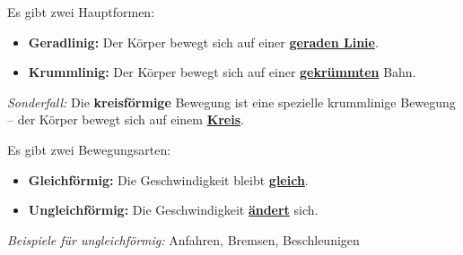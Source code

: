 \documentclass[11pt, a4paper]{article}
\newcommand{\abschnitt}[1]{%
    \vspace{8pt}%
    \noindent{\large\bfseries\textcolor{physik}{#1}}%
    \vspace{4pt}%
}
\newcommand{\lsg}[1]{\textcolor{loesung}{\underline{\textbf{#1}}}}
\begin{document}
\begin{merkkasten}
Es gibt zwei Hauptformen:
\begin{itemize}[leftmargin=1.5em, itemsep=2pt]
    \item \textbf{Geradlinig:} Der Körper bewegt sich auf einer \lsg{geraden Linie}.
    \item \textbf{Krummlinig:} Der Körper bewegt sich auf einer \lsg{gekrümmten} Bahn.
\end{itemize}

\textit{Sonderfall:} Die \textbf{kreisförmige} Bewegung ist eine spezielle krummlinige Bewegung -- der Körper bewegt sich auf einem \lsg{Kreis}.
\end{merkkasten}

\vspace{0.3em}

\abschnitt{3. Einteilung nach Bewegungsart}

\begin{center}
\end{center}

\begin{merkkasten}
Es gibt zwei Bewegungsarten:
\begin{itemize}[leftmargin=1.5em, itemsep=2pt]
    \item \textbf{Gleichförmig:} Die Geschwindigkeit bleibt \lsg{gleich}.
    \item \textbf{Ungleichförmig:} Die Geschwindigkeit \lsg{ändert} sich.
\end{itemize}
\textit{Beispiele für ungleichförmig:} Anfahren, Bremsen, Beschleunigen
\end{merkkasten}
\end{document}
